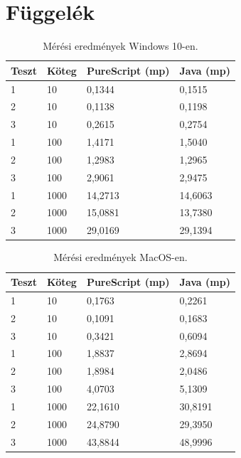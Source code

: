 \documentclass[12pt]{article}
\begin{document}
\newpage
\section*{Függelék}

\begin{table}[h!]
\centering
\begin{tabular}{ |p{3cm}|p{3cm}|p{3cm}|p{3cm}| } 
\hline
\textbf{Teszt} & \textbf{Köteg} &\textbf{PureScript (mp)} &\textbf{Java (mp)}\\
\hline 1& 10& 0,1344&0,1515\\
\hline 2& 10& 0,1138&0,1198\\
\hline 3& 10&0,2615 &0,2754\\
\hline 1& 100& 1,4171&1,5040\\
\hline 2& 100& 1,2983&1,2965\\
\hline 3& 100& 2,9061&2,9475\\
\hline 1& 1000& 14,2713&14,6063\\
\hline 2& 1000&15,0881 &13,7380\\
\hline 3& 1000&29,0169 &29,1394\\
\hline
\end{tabular}
\caption{Mérési eredmények Windows 10-en.}
\end{table}

\begin{table}[h!]
\centering
\begin{tabular}{ |p{3cm}|p{3cm}|p{3cm}|p{3cm}| } 
\hline
\textbf{Teszt} & \textbf{Köteg} &\textbf{PureScript (mp)} &\textbf{Java (mp)}\\
\hline 1& 10&0,1763 &0,2261\\
\hline 2& 10& 0,1091&0,1683\\
\hline 3& 10& 0,3421&0,6094\\
\hline 1& 100& 1,8837&2,8694\\
\hline 2& 100& 1,8984&2,0486\\
\hline 3& 100& 4,0703&5,1309\\
\hline 1& 1000& 22,1610&30,8191\\
\hline 2& 1000& 24,8790&29,3950\\
\hline 3& 1000& 43,8844&48,9996\\
\hline
\end{tabular}
\caption{Mérési eredmények MacOS-en.}
\end{table}
\end{document}
